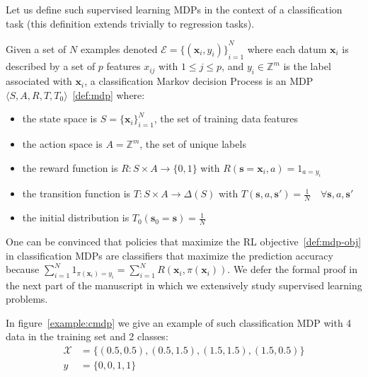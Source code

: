 Let us define such supervised learning MDPs in the context of a classification task (this definition extends trivially to regression tasks).
\begin{definition}\label{def:cmdp}
    Given a set of $N$ examples denoted $\mathcal{E} = {\{(\boldsymbol{x}_i, y_i)\}}_{i=1}^N$ where each datum $\boldsymbol{x}_i$ is described by a set of $p$ features $x_{ij}$ with $1\leq j \leq p$, and $y_i \in \mathbb{Z}^m$ is the label associated with $\boldsymbol{x}_i$, a classification Markov decision Process is an MDP $\langle S, A, R, T, T_0 \rangle$~\ref{def:mdp} where:
    \begin{itemize}
        \item the state space is $S={\{\boldsymbol{x}_i\}}_{i=1}^N$, the set of training data features
        \item the action space is $A=\mathbb{Z}^m$, the set of unique labels
        \item the reward function is $R:S\times A \rightarrow \{0, 1\}$ with $R(\boldsymbol{s}=\boldsymbol{x}_i, a) = 1_{a=y_i}$
        \item the transition function is $T:S\times A \rightarrow \Delta(S)$ with $T(\boldsymbol{s}, a, \boldsymbol{s}') = \frac{1}{N} \quad \forall \boldsymbol{s}, a, \boldsymbol{s}'$
        \item the initial distribution is $T_0(\boldsymbol{s}_0 = \boldsymbol{s}) = \frac{1}{N}$
    \end{itemize}
\end{definition}

One can be convinced that policies that maximize the RL objective~\ref{def:mdp-obj} in classification MDPs are classifiers that maximize the prediction accuracy because $\sum_{i=1}^N 1_{\pi(\boldsymbol{x}_i)=y_i} = \sum_{i=1}^N R(\boldsymbol{x}_i, \pi(\boldsymbol{x}_i))$.
We defer the formal proof in the next part of the manuscript in which we extensively study supervised learning problems.

In figure~\ref{example:cmdp} we give an example of such classification MDP with 4 data in the training set and 2 classes:
\begin{align*}
    \mathcal{X} &= \{(0.5, 0.5), (0.5, 1.5), (1.5, 1.5), (1.5, 0.5)\}\\
    y &= \{0, 0, 1, 1\} 
\end{align*}


